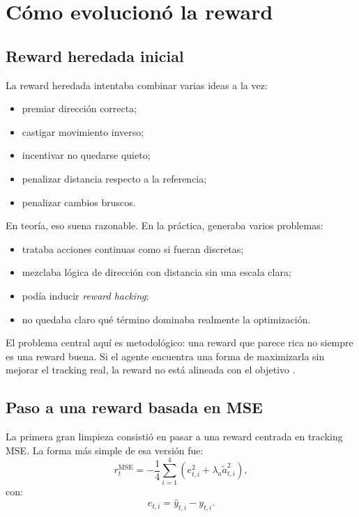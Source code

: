 \documentclass[11pt,a4paper]{article}
\begin{document}
\section{C\'omo evolucion\'o la reward}

\subsection{Reward heredada inicial}

La reward heredada intentaba combinar varias ideas a la vez:
\begin{itemize}[leftmargin=1.2cm]
    \item premiar direcci\'on correcta;
    \item castigar movimiento inverso;
    \item incentivar no quedarse quieto;
    \item penalizar distancia respecto a la referencia;
    \item penalizar cambios bruscos.
\end{itemize}

En teor\'ia, eso suena razonable. En la pr\'actica, generaba varios problemas:
\begin{itemize}[leftmargin=1.2cm]
    \item trataba acciones continuas como si fueran discretas;
    \item mezclaba l\'ogica de direcci\'on con distancia sin una escala clara;
    \item pod\'ia inducir \emph{reward hacking};
    \item no quedaba claro qu\'e t\'ermino dominaba realmente la optimizaci\'on.
\end{itemize}

El problema central aqu\'i es metodol\'ogico: una reward que parece rica no siempre es una reward buena. Si el agente encuentra una forma de maximizarla sin mejorar el tracking real, la reward no est\'a alineada con el objetivo \citep{deng2025reward}.

\subsection{Paso a una reward basada en MSE}

La primera gran limpieza consisti\'o en pasar a una reward centrada en tracking MSE. La forma m\'as simple de esa versi\'on fue:
\begin{equation}
r_t^{\text{MSE}}
=
-
\frac{1}{4}\sum_{i=1}^{4}
\left(
e_{t,i}^{2}
+
\lambda_a \tilde{a}_{t,i}^{2}
\right),
\end{equation}
con:
\begin{equation}
e_{t,i} = \hat{y}_{t,i} - y_{t,i}.
\end{equation}
\end{document}
